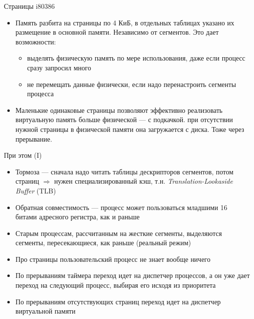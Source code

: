 \documentclass[xetex,aspectratio=43]{beamer}
\begin{document}
\begin{frame}{Страницы i80386}
    \begin{itemize}
        \tightlist
        \item
        Память разбита на страницы по 4 КиБ, в отдельных таблицах указано их
        размещение в основной памяти. Независимо от сегментов. Это дает
        возможности:

        \begin{itemize}
            \tightlist
            \item
            выделять физическую память по мере использования, даже если процесс
            сразу запросил много
            \item
            не перемещать данные физически, если надо перенастроить сегменты
            процесса
        \end{itemize}
        \item
        Маленькие одинаковые страницы позволяют эффективно реализовать
        виртуальную память больше физической --- с подкачкой. при отсутствии
        нужной страницы в физической памяти она загружается с диска. Тоже
        через прерывание.
    \end{itemize}
\end{frame}

\begin{frame}{При этом (I)}
    \begin{itemize}
        \tightlist
        \item
        Тормоза --- сначала надо читать таблицы дескрипторов сегментов, потом
        страниц \(\Rightarrow\) нужен специализированный кэш, т.н. \emph{Translation-Lookaside Buffer} (TLB)
        \item
        Обратная совместимость --- процесс может пользоваться младшими 16
        битами адресного регистра, как и раньше
        \item
        Старым процессам, рассчитанным на жесткие сегменты, выделяются
        сегменты, пересекающиеся, как раньше (реальный режим)
        \item
        Про страницы пользовательский процесс не знает вообще ничего
        \item
        По прерываниям таймера переход идет на диспетчер процессов, а он уже
        дает переход на следующий процесс, выбирая его исходя из приоритета
        \item
        По прерываниям отсутствующих страниц переход идет на диспетчер
        виртуальной памяти
    \end{itemize}
\end{frame}
\end{document}
